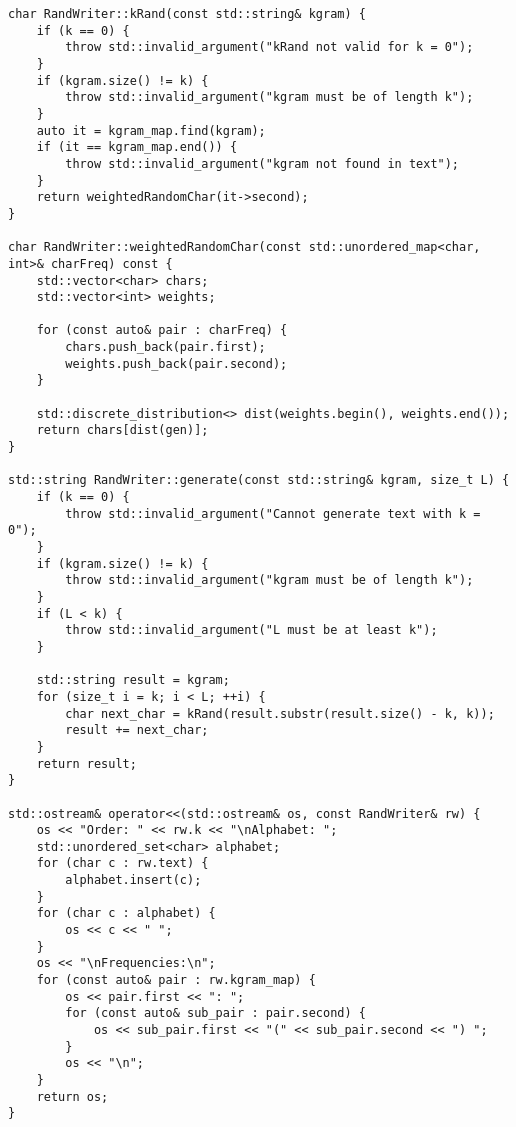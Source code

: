 \documentclass[12pt]{article}
\begin{document}
\begin{lstlisting}[style=cppcode]
char RandWriter::kRand(const std::string& kgram) {
    if (k == 0) {
        throw std::invalid_argument("kRand not valid for k = 0");
    }
    if (kgram.size() != k) {
        throw std::invalid_argument("kgram must be of length k");
    }
    auto it = kgram_map.find(kgram);
    if (it == kgram_map.end()) {
        throw std::invalid_argument("kgram not found in text");
    }
    return weightedRandomChar(it->second);
}

char RandWriter::weightedRandomChar(const std::unordered_map<char, int>& charFreq) const {
    std::vector<char> chars;
    std::vector<int> weights;

    for (const auto& pair : charFreq) {
        chars.push_back(pair.first);
        weights.push_back(pair.second);
    }

    std::discrete_distribution<> dist(weights.begin(), weights.end());
    return chars[dist(gen)];
}

std::string RandWriter::generate(const std::string& kgram, size_t L) {
    if (k == 0) {
        throw std::invalid_argument("Cannot generate text with k = 0");
    }
    if (kgram.size() != k) {
        throw std::invalid_argument("kgram must be of length k");
    }
    if (L < k) {
        throw std::invalid_argument("L must be at least k");
    }

    std::string result = kgram;
    for (size_t i = k; i < L; ++i) {
        char next_char = kRand(result.substr(result.size() - k, k));
        result += next_char;
    }
    return result;
}

std::ostream& operator<<(std::ostream& os, const RandWriter& rw) {
    os << "Order: " << rw.k << "\nAlphabet: ";
    std::unordered_set<char> alphabet;
    for (char c : rw.text) {
        alphabet.insert(c);
    }
    for (char c : alphabet) {
        os << c << " ";
    }
    os << "\nFrequencies:\n";
    for (const auto& pair : rw.kgram_map) {
        os << pair.first << ": ";
        for (const auto& sub_pair : pair.second) {
            os << sub_pair.first << "(" << sub_pair.second << ") ";
        }
        os << "\n";
    }
    return os;
}

\end{lstlisting}
\end{document}
